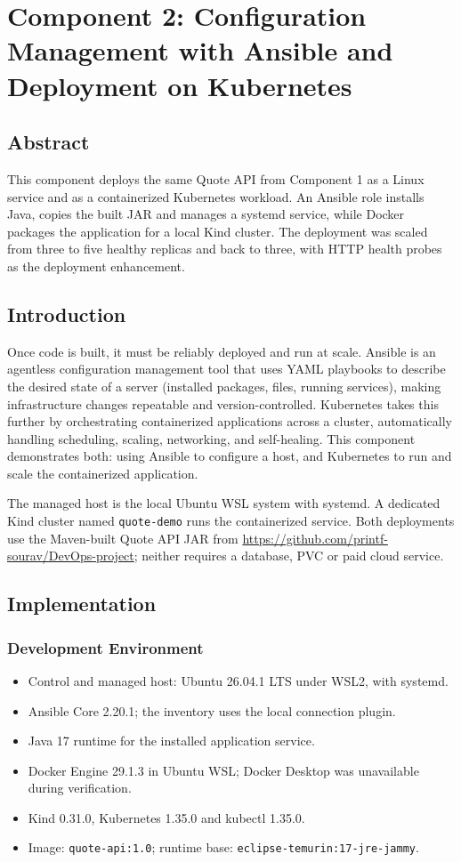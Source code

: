 \documentclass[12pt,a4paper]{article}
\begin{document}
\newpage
\section*{Component 2: Configuration Management with Ansible and Deployment on Kubernetes}

\subsection*{Abstract}
This component deploys the same Quote API from Component 1 as a Linux service and as a containerized Kubernetes workload. An Ansible role installs Java, copies the built JAR and manages a systemd service, while Docker packages the application for a local Kind cluster. The deployment was scaled from three to five healthy replicas and back to three, with HTTP health probes as the deployment enhancement.

\subsection*{Introduction}
Once code is built, it must be reliably deployed and run at scale. Ansible is an agentless configuration management tool that uses YAML playbooks to describe the desired state of a server (installed packages, files, running services), making infrastructure changes repeatable and version-controlled. Kubernetes takes this further by orchestrating containerized applications across a cluster, automatically handling scheduling, scaling, networking, and self-healing. This component demonstrates both: using Ansible to configure a host, and Kubernetes to run and scale the containerized application.

The managed host is the local Ubuntu WSL system with systemd. A dedicated Kind cluster named \texttt{quote-demo} runs the containerized service. Both deployments use the Maven-built Quote API JAR from \url{https://github.com/printf-sourav/DevOps-project}; neither requires a database, PVC or paid cloud service.

\subsection*{Implementation}
\subsubsection*{Development Environment}
\begin{itemize}[nosep]
\item Control and managed host: Ubuntu 26.04.1 LTS under WSL2, with systemd.
\item Ansible Core 2.20.1; the inventory uses the local connection plugin.
\item Java 17 runtime for the installed application service.
\item Docker Engine 29.1.3 in Ubuntu WSL; Docker Desktop was unavailable during verification.
\item Kind 0.31.0, Kubernetes 1.35.0 and kubectl 1.35.0.
\item Image: \texttt{quote-api:1.0}; runtime base: \texttt{eclipse-temurin:17-jre-jammy}.
\end{itemize}
\end{document}
